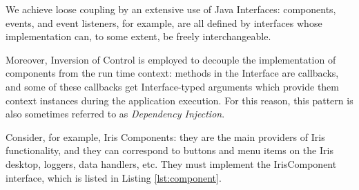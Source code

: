 \documentclass[5p]{elsarticle}
\begin{document}
We achieve loose coupling by an extensive use of Java Interfaces: components, events, and event listeners, for example, are all defined by interfaces whose implementation can, to some extent, be freely interchangeable.

Moreover, Inversion of Control is employed to decouple the implementation of components from the run time context: methods in the Interface are callbacks, and some of these callbacks get Interface-typed arguments which provide them context instances during the application execution. For this reason, this pattern is also sometimes referred to as \emph{Dependency Injection}.

Consider, for example, Iris Components: they are the main providers of Iris functionality, and they can correspond to buttons and menu items on the Iris desktop, loggers, data handlers, etc. They must implement the IrisComponent interface, which is listed in Listing \ref{lst:component}.
\end{document}
